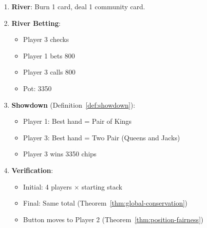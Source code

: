 \documentclass[11pt,a4paper]{article}
\begin{document}
\begin{enumerate}
    \item \textbf{River}: Burn 1 card, deal 1 community card.

    \item \textbf{River Betting}:
    \begin{itemize}
        \item Player 3 checks
        \item Player 1 bets 800
        \item Player 3 calls 800
        \item Pot: 3350
    \end{itemize}

    \item \textbf{Showdown} (Definition~\ref{def:showdown}):
    \begin{itemize}
        \item Player 1: Best hand = Pair of Kings
        \item Player 3: Best hand = Two Pair (Queens and Jacks)
        \item Player 3 wins 3350 chips
    \end{itemize}

    \item \textbf{Verification}:
    \begin{itemize}
        \item Initial: 4 players × starting stack
        \item Final: Same total (Theorem~\ref{thm:global-conservation})
        \item Button moves to Player 2 (Theorem~\ref{thm:position-fairness})
    \end{itemize}
\end{enumerate}
\end{document}
